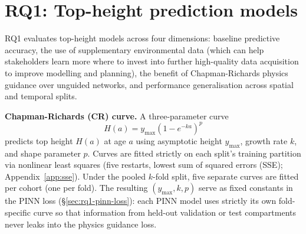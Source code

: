 \section{RQ1: Top-height prediction models}
\label{sec:rq1-models}

RQ1 evaluates top-height models across four dimensions: baseline predictive accuracy, the use of supplementary environmental data (which can help stakeholders learn more where to invest into further high-quality data acquisition to improve modelling and planning), the benefit of Chapman-Richards physics guidance over unguided networks, and performance generalisation across spatial and temporal splits.

\textbf{Chapman-Richards (CR) curve.} A three-parameter curve
\begin{equation}
H(a) = y_{\max}\left(1-e^{-ka}\right)^{p}
\label{eq:cr}
\end{equation}
predicts top height $H(a)$ at age $a$ using asymptotic height $y_{\max}$, growth rate $k$, and shape parameter $p$. Curves are fitted strictly on each split's training partition via nonlinear least squares (five restarts, lowest sum of squared errors (SSE); Appendix~\ref{app:sse}). Under the pooled $k$-fold split, five separate curves are fitted per cohort (one per fold). The resulting $(y_{\max}, k, p)$ serve as fixed constants in the PINN loss (\S\ref{sec:rq1-pinn-loss}): each PINN model uses strictly its own fold-specific curve so that information from held-out validation or test compartments never leaks into the physics guidance loss.

